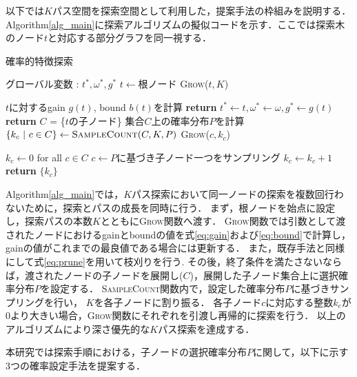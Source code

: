 以下では$K$パス空間を探索空間として利用した，提案手法の枠組みを説明する．
Algorithm\ref{alg_main}に探索アルゴリズムの擬似コードを示す．ここでは探索木のノード$t$と対応する部分グラフを同一視する．
\begin{algorithm}
	\small 
	\caption{確率的特徴探索}\label{alg_main}
	\begin{algorithmic}[1]
		\State グローバル変数 : $t^*,\omega^*,g^*$
		\State $t \gets \text{根ノード}$ 
		\State \textsc{Grow}($t,K$)
		\EndProcedure

		\State $t$に対するgain $g(t)$, bound $b(t)$を計算
		\State \textbf{return}
		\EndIf
		\State $t^* \gets t,\omega^* \gets \omega,g^* \gets g(t)$
		\EndIf
		\State \textbf{return}
		\EndIf
		\State$C$ = \{$t$の子ノード\}
		\State 集合$C$上の確率分布$P$を計算 
		\State $\{k_c \ | \ c \in C\} \gets \textsc{SampleCount}(C,K,P)$
		\State \textsc{Grow}($c,k_c$)
		\EndIf
		\EndFor
		\EndFunction

		\State $k_c \gets 0$ for all $c \in C$ 
		\State $c \gets \text{$P$に基づき子ノード一つをサンプリング} $
		\State $k_c \gets k_c + 1$
		\EndFor
		\State \textbf{return} $\{k_c\}$
		\EndFunction
	\end{algorithmic}
\end{algorithm}

Algorithm\ref{alg_main}では，$K$パス探索において同一ノードの探索を複数回行わないために，探索とパスの成長を同時に行う．
まず，根ノードを始点に設定し，探索パスの本数$K$とともに\textsc{Grow}関数へ渡す．
\textsc{Grow}関数では引数として渡されたノードにおけるgainとboundの値を式\eqref{eq:gain}および\eqref{eq:bound}で計算し，gainの値がこれまでの最良値である場合には更新する．
また，既存手法と同様にして式\eqref{eq:prune}を用いて枝刈りを行う.
その後，終了条件を満たさないならば，渡されたノードの子ノードを展開し($C$)，展開した子ノード集合上に選択確率分布$P$を設定する．
\textsc{SampleCount}関数内で，設定した確率分布$P$に基づきサンプリングを行い， $K$を各子ノードに割り振る．
各子ノード$c$に対応する整数$k_c$が$0$より大きい場合，\textsc{Grow}関数にそれぞれを引渡し再帰的に探索を行う．
以上のアルゴリズムにより深さ優先的な$K$パス探索を達成する．

本研究では探索手順における，子ノードの選択確率分布$P$に関して，以下に示す3つの確率設定手法を提案する．

